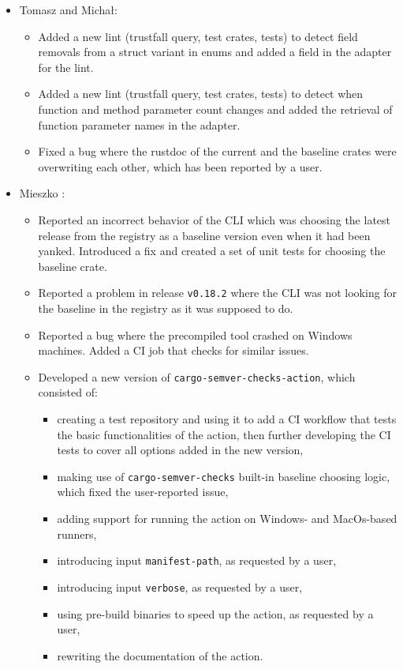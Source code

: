 \documentclass[licencjacka,en]{pracamgr}
\begin{document}
\begin{itemize}
	\item Tomasz and Michał:
		\begin{itemize}
			\item Added a new lint (trustfall query, test crates, tests) to detect field removals
				from a struct variant in enums and added a field in the adapter for the lint.
			\item Added a new lint (trustfall query, test crates, tests) to detect when function
				and method parameter count changes and added the retrieval of function parameter
				names in the adapter.
			\item Fixed a bug where the rustdoc of the current and the baseline crates
				were overwriting each other, which has been reported by a user.
		\end{itemize}

	\item Mieszko \cite{responsibilities-mieszko}:
		\begin{itemize}
			\item Reported an incorrect behavior of the CLI which was choosing the latest release
				from the registry as a baseline version even when it had been yanked.
				Introduced a fix and created a set of unit tests for choosing the baseline crate.
			\item Reported a problem in release \texttt{v0.18.2} where the CLI was not looking for
				the baseline in the registry as it was supposed to do.
			\item Reported a bug where the precompiled tool crashed on Windows machines.
				Added a CI job that checks for similar issues.
			\item Developed a new version of \texttt{cargo-semver-checks-action}, which consisted of:
			\begin{itemize}
				\item creating a test repository \cite{responsibilities-mieszko-action-tests}
					and using it to add a CI workflow that tests the basic functionalities of
					the action, then further developing the CI tests to cover all options added in
					the new version,
				\item making use of \texttt{cargo-semver-checks} built-in baseline choosing logic,
					which fixed the user-reported issue,
				\item adding support for running the action on Windows- and MacOs-based runners,
				\item introducing input \texttt{manifest-path}, as requested by a user,
				\item introducing input \texttt{verbose}, as requested by a user,
				\item using pre-build binaries to speed up the action, as requested by a user,
				\item rewriting the documentation of the action.
			\end{itemize}
		\end{itemize}


\end{itemize}
\end{document}
